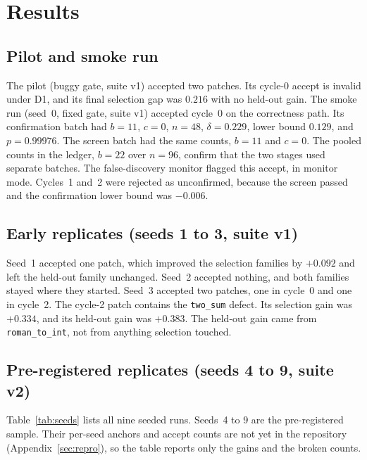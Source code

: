 \documentclass[11pt]{article}
\begin{document}
\section{Results}
\label{sec:results}

\subsection{Pilot and smoke run}

The pilot (buggy gate, suite v1) accepted two patches. Its cycle-0 accept is invalid under D1, and its final selection gap was $0.216$ with no held-out gain. The smoke run (seed~0, fixed gate, suite v1) accepted cycle~0 on the correctness path. Its confirmation batch had $b=11$, $c=0$, $n=48$, $\delta=0.229$, lower bound $0.129$, and $p=0.99976$. The screen batch had the same counts, $b=11$ and $c=0$. The pooled counts in the ledger, $b=22$ over $n=96$, confirm that the two stages used separate batches. The false-discovery monitor flagged this accept, in monitor mode. Cycles~1 and~2 were rejected as unconfirmed, because the screen passed and the confirmation lower bound was $-0.006$.

\subsection{Early replicates (seeds 1 to 3, suite v1)}

Seed~1 accepted one patch, which improved the selection families by $+0.092$ and left the held-out family unchanged. Seed~2 accepted nothing, and both families stayed where they started. Seed~3 accepted two patches, one in cycle~0 and one in cycle~2. The cycle-2 patch contains the \texttt{two\_sum} defect. Its selection gain was $+0.334$, and its held-out gain was $+0.383$. The held-out gain came from \texttt{roman\_to\_int}, not from anything selection touched.

\subsection{Pre-registered replicates (seeds 4 to 9, suite v2)}

Table~\ref{tab:seeds} lists all nine seeded runs. Seeds~4 to 9 are the pre-registered sample. Their per-seed anchors and accept counts are not yet in the repository (Appendix~\ref{sec:repro}), so the table reports only the gains and the broken counts.

\begin{table}[t]
\centering\small
\caption{Gains over the cycle-0 anchor on 120 fresh problems per family, for seeds 1 to 9. ``Gap'' is selection gain minus held-out gain. ``--'' means the accept count is not recorded in this repository. Seeds 1 to 3 are suite v1, seeds 4 to 9 are suite v2. No run had a broken problem in its final evaluation.}
\label{tab:seeds}

\end{table}
\end{document}
